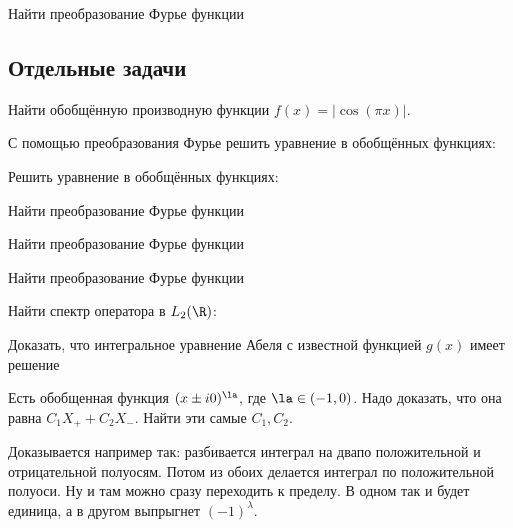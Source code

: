 \documentclass[a4paper]{article}
\begin{document}
\begin{problem}
Найти преобразование Фурье функции
\end{problem}

\subsection{Отдельные задачи}
\setcounter{problem}{0}

\begin{problem}
Найти обобщённую производную функции $f(x) = |\cos (\pi x)|$.
\end{problem}

\begin{problem}
С помощью преобразования Фурье решить уравнение в обобщённых функциях:
\end{problem}


\begin{problem}
Решить уравнение в обобщённых функциях:
\end{problem}

\begin{problem}
Найти преобразование Фурье функции
\end{problem}


\begin{problem}
Найти преобразование Фурье функции
\end{problem}

\begin{problem}
Найти преобразование Фурье функции
\end{problem}

\begin{problem}
Найти спектр оператора в $L_2(\R)$:
\end{problem}

\begin{problem}
Доказать, что интегральное уравнение Абеля
с известной функцией $g(x)$ имеет решение
\end{problem}

\begin{problem}
Есть обобщенная функция $(x \pm i0)^{\la}$, где $\la\in(-1,0)$.
Надо доказать, что она равна $C_1X_{+}+C_2X_{-}$. Найти эти самые $C_1, C_2$.
\end{problem}
\begin{hint}
Доказывается например так: разбивается интеграл на два\т по положительной и отрицательной полуосям.
Потом из обоих делается интеграл по положительной полуоси. Ну и там можно сразу переходить к пределу.
В одном так и будет единица, а в другом выпрыгнет $(-1)^{\lambda}$.
\end{hint}
\end{document}
